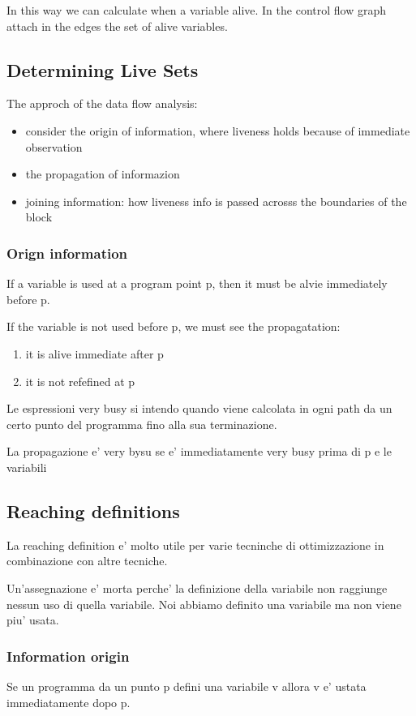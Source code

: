 In this way we can calculate when a variable alive. In the control flow graph
attach in the edges the set of alive variables.

\subsection{Determining Live Sets}
The approch of the data flow analysis:
\begin{itemize}
\item consider the origin of information, where liveness holds because of
immediate observation
\item the propagation of informazion
\item joining information: how liveness info is passed acrosss the boundaries
of the block
\end{itemize}

\subsubsection{Orign information}
If a variable is used at a program point p, then it must be alvie immediately
before p.

If the variable is not used before p, we must see the propagatation:
\begin{enumerate}
\item it is alive immediate after p
\item it is not refefined at p
\end{enumerate}

Le espressioni very busy si intendo quando viene calcolata in ogni path da un
certo punto del programma fino alla sua terminazione.

La propagazione e' very bysu se e' immediatamente very busy prima di p e le
variabili

\subsection{Reaching definitions}
La reaching definition e' molto utile per varie tecninche di ottimizzazione in
combinazione con altre tecniche.

Un'assegnazione e' morta perche' la definizione della variabile non raggiunge
nessun uso di quella variabile. Noi abbiamo definito una variabile ma non viene
piu' usata.

\subsubsection{Information origin}
Se un programma da un punto p defini una variabile v allora v e' ustata
immediatamente dopo p.
